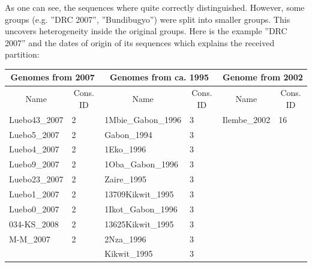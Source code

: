 \documentclass[a0paper,portrait]{baposter}
\begin{document}
\begin{poster}
{%
As one can see, the sequences where quite correctly distinguished. However, some groups (e.g. ''DRC 2007'', ''Bundibugyo'')  were split into smaller groups. This uncovers heterogeneity inside the original groups. Here is the example ''DRC 2007'' and the dates of origin of its sequences which explains the received partition:
\begin{center}
\begin{tabular}{|l|l|l|l|l|l|}
\hline
\multicolumn{2}{|c}{Genomes from 2007} & \multicolumn{2}{|c|}{Genomes from ca. 1995} & \multicolumn{2}{c|}{Genome from 2002} \\ \hline
\multicolumn{1}{|c|}{Name}   & \multicolumn{1}{c|}{Cons. ID} & \multicolumn{1}{c|}{Name}  & \multicolumn{1}{c|}{Cons. ID}  & \multicolumn{1}{c|}{Name}  & \multicolumn{1}{c|}{Cons. ID} \\ \hline
Luebo43\_2007 &  2 &	1Mbie\_Gabon\_1996	& 	3  & Ilembe\_2002 & 16 		\\ \hline
Luebo5\_2007  &  2 &	Gabon\_1994			& 	3	& & \\ \hline
Luebo4\_2007  &  2 &	1Eko\_1996			& 	3	& & \\ \hline
Luebo9\_2007  &  2 &	1Oba\_Gabon\_1996	& 	3	& & \\ \hline
Luebo23\_2007 &  2 &	Zaire\_1995			& 	3	& & \\ \hline
Luebo1\_2007  &  2 &	13709Kikwit\_1995 	& 	3	& & \\ \hline
Luebo0\_2007  &  2 &	1Ikot\_Gabon\_1996 	& 	3	& & \\ \hline
034-KS\_2008  &  2 &	13625Kikwit\_1995 	& 	3	& & \\ \hline
M-M\_2007	  &  2 &	2Nza\_1996	 		& 	3	& & \\ \hline
			  &	   &	Kikwit\_1995	 	& 	3	& & \\ \hline
\end{tabular}
\end{center}




%
%
%
}

\end{poster}
\end{document}
